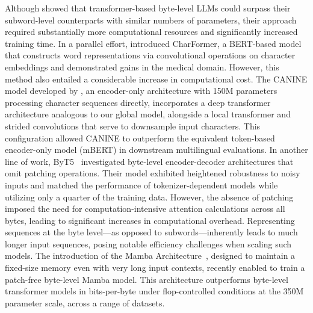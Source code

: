 Although \cite{Choe2019BridgingTG} showed that transformer-based byte-level LLMs could surpass their subword-level counterparts with similar numbers of parameters, their approach required substantially more computational resources and significantly increased training time. In a parallel effort, \cite{el2020characterbert} introduced CharFormer, a BERT-based model that constructs word representations via convolutional operations on character embeddings and demonstrated gains in the medical domain. However, this method also entailed a considerable increase in computational cost. The CANINE model developed by \cite{clark2022canine}, an encoder-only architecture with 150M parameters processing character sequences directly, incorporates a deep transformer architecture analogous to our global model, alongside a local transformer and strided convolutions that serve to downsample input characters. This configuration allowed CANINE to outperform the equivalent token-based encoder-only model (mBERT) in downstream multilingual evaluations. In another line of work, ByT5~\citep{xue2022byt5} investigated byte-level encoder-decoder architectures that omit patching operations. Their model exhibited heightened robustness to noisy inputs and matched the performance of tokenizer-dependent models while utilizing only a quarter of the training data. However, the absence of patching imposed the need for computation-intensive attention calculations across all bytes, leading to significant increases in computational overhead. Representing sequences at the byte level—as opposed to subwords—inherently leads to much longer input sequences, posing notable efficiency challenges when scaling such models. The introduction of the Mamba Architecture~\citep{gu2023mamba}, designed to maintain a fixed-size memory even with very long input contexts, recently enabled \cite{wang2024mambabyte} to train a patch-free byte-level Mamba model. This architecture outperforms byte-level transformer models in bits-per-byte under flop-controlled conditions at the 350M parameter scale, across a range of datasets.

